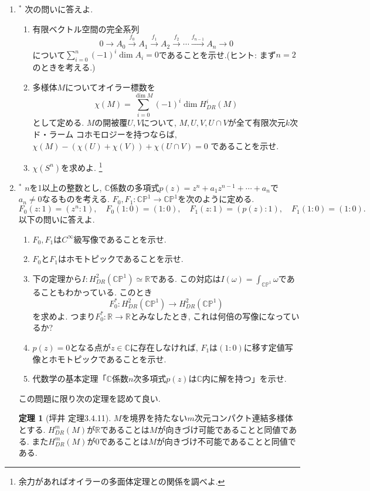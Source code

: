 \documentclass[dvipdfmx,a4paper,11pt]{article}
\newcommand{\R}{\mathbb{R}}
\newcommand{\C}{\mathbb{C}}
\theoremstyle{definition}
\newtheorem{thm}{定理}
\begin{document}
\begin{enumerate}[label=\textbf{問}\ref*{sec-deRham}.\arabic*]
\item $^{*}$ 次の問いに答えよ.
\begin{enumerate}
 \setlength{\parskip}{0cm}
  \setlength{\itemsep}{2pt}
\item 有限ベクトル空間の完全系列
$$
0 \to A_0 \stackrel{f_0}{\to} A_1 \stackrel{f_1}{\to} A_2 \stackrel{f_2}{\to}  \cdots \stackrel{f_{n-1}}{\to} A_{n} \to 0
$$
について$\sum_{i=0}^{n} (-1)^i \dim A_i =0$であることを示せ.(ヒント: まず$n=2$のときを考える.)
\item 多様体$M$についてオイラー標数を
$$
\chi (M) = \sum_{i=0}^{\dim M} (-1)^i \dim H^{i}_{DR}(M)
$$
として定める. 
$M$の開被覆$U, V$について, $M, U,V, U\cap V$が全て有限次元$k$次ド・ラーム コホモロジーを持つならば, 
$
\chi(M) - (\chi(U) + \chi(V) ) + \chi (U \cap V) =0
$
であることを示せ. 
\item $\chi(S^n)$を求めよ. \footnote{余力があればオイラーの多面体定理との関係を調べよ. }

\end{enumerate}

\item \label{fund_alg} $^{*}$ $n$を1以上の整数とし, $\C$係数の多項式$p(z) = z^n + a_{1}z^{n-1} + \cdots + a_n$で$a_n\neq 0$なるものを考える. 
$F_0, F_1 : \C\mathbb{P}^1 \to  \C\mathbb{P}^1$を次のように定める. 
$$
F_0 (z: 1) = (z^n : 1), \quad F_0 (1: 0) = (1 : 0), \quad F_1 (z: 1) = (p(z) : 1), \quad F_1(1: 0) = (1 : 0).
$$
以下の問いに答えよ. 
\begin{enumerate}
 \setlength{\parskip}{0cm}
  \setlength{\itemsep}{2pt}
  \item $F_0, F_1$は$C^{\infty}$級写像であることを示せ.
  \item $F_0$と$F_1$はホモトピックであることを示せ. 
 \item 下の定理から$I : H^{2}_{DR}(\C\mathbb{P}^1) \simeq \R$である.  この対応は$I(\omega) = \int_{\C\mathbb{P}^1} \omega$であることもわかっている. このとき
 $$
F_{0}^{*}:  H^{2}_{DR}(\C\mathbb{P}^1) \to  H^{2}_{DR}(\C\mathbb{P}^1)
 $$ 
 を求めよ. つまり$F_{0}^{*}: \R \to \R$とみなしたとき, これは何倍の写像になっているか? 
 \item $p(z) =0$となる点が$z \in \C$に存在しなければ, $F_1$は$(1:0)$に移す定値写像とホモトピックであることを示せ.
 \item 代数学の基本定理「$\C$係数$n$次多項式$p(z)$は$\C$内に解を持つ」を示せ. 
\end{enumerate}
この問題に限り次の定理を認めて良い. 
\begin{tcolorbox}[
    colback = white,
    colframe = green!35!black,
    fonttitle = \bfseries,
    breakable = true]
\begin{thm}[坪井 定理3.4.11]
$M$を境界を持たない$m$次元コンパクト連結多様体とする. 
$H^{m}_{DR}(M)$が$\R$であることは$M$が向きづけ可能であることと同値である. 
また$H^{m}_{DR}(M)$が$0$であることは$M$が向きづけ不可能であることと同値である. 
\end{thm}

\end{tcolorbox} 



\end{enumerate}









 
\end{document}
